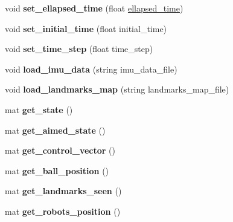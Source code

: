 \begin{DoxyCompactItemize}
void {\bfseries set\+\_\+ellapsed\+\_\+time} (float \hyperlink{class_robot_navigation_a4ccd950c2d302318d4635263096bc977}{ellapsed\+\_\+time})
\item 
\mbox{\label{class_robot_navigation_ad4127e6135f10fefffd0524e5cf224e3}} 
void {\bfseries set\+\_\+initial\+\_\+time} (float initial\+\_\+time)
\item 
\mbox{\label{class_robot_navigation_a5f47abc9fd8fe81c2d4df33cd732a84a}} 
void {\bfseries set\+\_\+time\+\_\+step} (float time\+\_\+step)
\item 
\mbox{\label{class_robot_navigation_af1ec4d21b09907e7c849ab603a173484}} 
void {\bfseries load\+\_\+imu\+\_\+data} (string imu\+\_\+data\+\_\+file)
\item 
\mbox{\label{class_robot_navigation_af936fdf445213270848a4fc881d1cdb7}} 
void {\bfseries load\+\_\+landmarks\+\_\+map} (string landmarks\+\_\+map\+\_\+file)
\item 
\mbox{\label{class_robot_navigation_a3ecd5c2f6f316b4b41b48cb0c28a944e}} 
mat {\bfseries get\+\_\+state} ()
\item 
\mbox{\label{class_robot_navigation_aa56d5bc1153358167a4ea2521050a0b9}} 
mat {\bfseries get\+\_\+aimed\+\_\+state} ()
\item 
\mbox{\label{class_robot_navigation_a825a8172dc71450817593b0dcd6c6dc2}} 
mat {\bfseries get\+\_\+control\+\_\+vector} ()
\item 
\mbox{\label{class_robot_navigation_ab04ff3cecd3441e13588f1a2c78f4e2c}} 
mat {\bfseries get\+\_\+ball\+\_\+position} ()
\item 
\mbox{\label{class_robot_navigation_acc50daa5ac82e2900f87d2b312afc518}} 
mat {\bfseries get\+\_\+landmarks\+\_\+seen} ()
\item 
\mbox{\label{class_robot_navigation_a9082eefeea50d92c1cf1ea07620733c3}} 
mat {\bfseries get\+\_\+robots\+\_\+position} ()

\end{DoxyCompactItemize}
